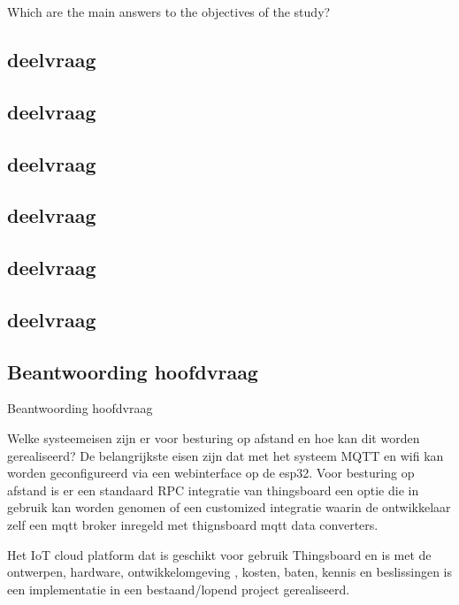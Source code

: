 		
		Which are the main answers to the objectives of the study?
		
		\subsection{deelvraag}
		
		\subsection{deelvraag}
		
		\subsection{deelvraag}
		
		\subsection{deelvraag}
		
		\subsection{deelvraag}
		
		\subsection{deelvraag}
		
		\subsection{Beantwoording hoofdvraag}
		
		
		Beantwoording hoofdvraag
		
		Welke systeemeisen zijn er voor besturing op afstand en hoe kan dit worden gerealiseerd?
		De belangrijkste eisen zijn dat met het systeem MQTT en wifi kan worden geconfigureerd via een webinterface op de esp32.
		Voor besturing op afstand is er een standaard RPC integratie van thingsboard een optie die in gebruik kan worden genomen of een customized integratie waarin de ontwikkelaar zelf een mqtt broker inregeld met thignsboard mqtt data converters.
		
		Het IoT cloud platform  dat is geschikt voor gebruik  Thingsboard  en is met de ontwerpen, hardware, ontwikkelomgeving , kosten, baten, kennis  en beslissingen is een implementatie in een bestaand/lopend project gerealiseerd.
		
		
		
